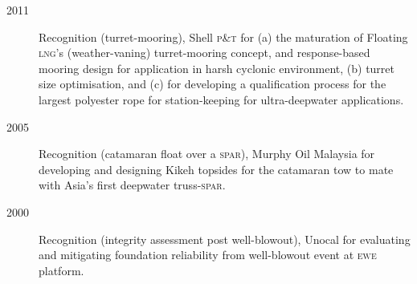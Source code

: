 \begin{description}
\item[2011]Recognition (turret-mooring), Shell \textsc{p\&t} for (a) the maturation of Floating \textsc{lng}'s (weather-vaning) turret-mooring concept, and response-based mooring design for application in harsh cyclonic environment, (b) turret size optimisation, and (c) for developing a qualification process for the largest polyester rope for station-keeping for ultra-deepwater applications.

\item[2005]Recognition (catamaran float over a \textsc{spar}), Murphy Oil Malaysia for developing and designing Kikeh topsides for the catamaran tow to mate with Asia's first deepwater truss-\textsc{spar}.


\item[2000]Recognition (integrity assessment post well-blowout), Unocal for evaluating and mitigating foundation reliability from well-blowout event at \textsc{ewe} platform.

\end{description}

